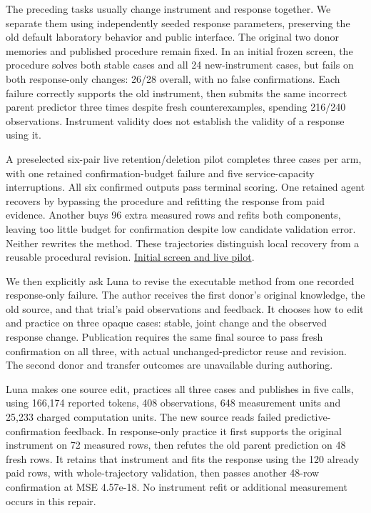 \documentclass[twoside,11pt]{article}
\begin{document}
The preceding tasks usually change instrument and response together. We separate
them using independently seeded response parameters, preserving the old default
laboratory behavior and public interface. The original two donor memories and
published procedure remain fixed. In an initial frozen screen, the procedure
solves both stable cases and all 24 new-instrument cases, but fails on both
response-only changes: 26/28 overall, with no false confirmations. Each failure
correctly supports the old instrument, then submits the same incorrect parent
predictor three times despite fresh counterexamples, spending 216/240 observations.
Instrument validity does not establish the validity of a response using it.


A preselected six-pair live retention/deletion pilot completes three cases per arm,
with one retained confirmation-budget failure and five service-capacity interruptions.
All six confirmed outputs pass terminal scoring. One retained agent recovers by
bypassing the procedure and refitting the response from paid evidence. Another
buys 96 extra measured rows and refits both components, leaving too little budget
for confirmation despite low candidate validation error. Neither rewrites the
method. These trajectories distinguish local recovery from a reusable procedural
revision. \hyperlink{artifact-69}{Initial screen and live pilot}.


We then explicitly ask Luna to revise the executable method from one recorded
response-only failure. The author receives the first donor's original knowledge,
the old source, and that trial's paid observations and feedback. It chooses how
to edit and practice on three opaque cases: stable, joint change and the observed
response change. Publication requires the same final source to pass fresh
confirmation on all three, with actual unchanged-predictor reuse and revision.
The second donor and transfer outcomes are unavailable during authoring.


Luna makes one source edit, practices all three cases and publishes in five calls,
using 166,174 reported tokens, 408 observations, 648 measurement units and 25,233
charged computation units. The new source reads failed predictive-confirmation
feedback. In response-only practice it first supports the original instrument
on 72 measured rows, then refutes the old parent prediction on 48 fresh rows.
It retains that instrument and fits the response using the 120 already paid rows,
with whole-trajectory validation, then passes another 48-row confirmation at
MSE 4.57e-18. No instrument refit or additional measurement occurs in this repair.
\end{document}

